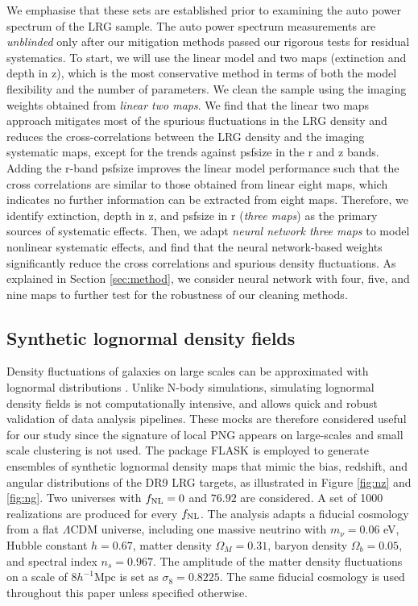  We emphasise that these sets are established prior to examining the auto power spectrum of the LRG sample. The auto power spectrum measurements are \textit{unblinded} only after our mitigation methods passed our rigorous tests for residual systematics. To start, we will use the linear model and two maps (extinction and depth in z), which is the most conservative method in terms of both the model flexibility and the number of parameters. We clean the sample using the imaging weights obtained from \textit{linear two maps}. We find that the linear two maps approach mitigates most of the spurious fluctuations in the LRG density and reduces the cross-correlations between the LRG density and the imaging systematic maps, except for the trends against psfsize in the r and z bands. Adding the r-band psfsize improves the linear model performance such that the cross correlations are similar to those obtained from linear eight maps, which indicates no further information can be extracted from eight maps. Therefore, we identify extinction, depth in z, and psfsize in r (\textit{three maps}) as the primary sources of systematic effects. Then, we adapt \textit{neural network three maps} to model nonlinear systematic effects, and find that the neural network-based weights significantly reduce the cross correlations and spurious density fluctuations. As explained in Section \ref{sec:method}, we consider neural network with four, five, and nine maps to further test for the robustness of our cleaning methods.


\subsection{Synthetic lognormal density fields}\label{ssec:mocks}
Density fluctuations of galaxies on large scales can be approximated with lognormal distributions \citep{coles1991}. Unlike N-body simulations, simulating lognormal density fields is not computationally intensive, and allows quick and robust validation of data analysis pipelines. These mocks are therefore considered useful for our study since the signature of local PNG appears on large-scales and small scale clustering is not used. The package \textsc{FLASK} \citep[Full-sky Lognormal Astro-fields Simulation Kit;][]{Xavier_2016} is employed to generate ensembles of synthetic lognormal density maps that mimic the bias, redshift, and angular distributions of the DR9 LRG targets, as illustrated in Figure \ref{fig:nz} and \ref{fig:ng}. Two universes with $f_{\rm NL}=0$ and $76.92$ are considered. A set of 1000 realizations are produced for every $f_{\rm NL}$. The analysis adapts a fiducial cosmology from a flat $\Lambda$CDM universe, including one massive neutrino with $m_{\nu}=0.06$ eV, Hubble constant $h = 0.67$, matter density $\Omega_{M}=0.31$, baryon density $\Omega_{b}=0.05$, and spectral index $n_{s}=0.967$. The amplitude of the matter density fluctuations on a scale of $8 h^{-1} \text{Mpc}$ is set as $\sigma_{8}=0.8225$. The same fiducial cosmology is used throughout this paper unless specified otherwise. 

